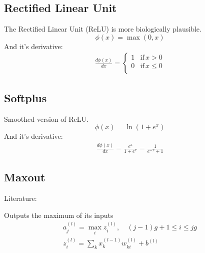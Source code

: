 \subsection{Rectified Linear Unit}
The Rectified Linear Unit (ReLU) is more biologically plausible.
\begin{equation}
\phi(x) = \max(0, x)
\end{equation}
And it's derivative:
\begin{align*}
\frac{d\phi(x)}{dx} = 
	\begin{cases}
		1 & \text{if}\, x > 0\\
		0 & \text{if}\, x \leq 0\\
	\end{cases}
\end{align*}

\subsection{Softplus}
Smoothed version of ReLU.
\begin{equation}\label{eq:softplus}
\phi(x) = \ln(1 + e^x)
\end{equation}
And it's derivative:
\begin{align*}
\frac{d\phi(x)}{dx} = \frac{e^x}{1 + e^x} = \frac{1}{e^{-x} + 1}
\end{align*}

\subsection{Maxout}
Literature: \cite{Goodfellow2013}

Outputs the maximum of its inputs
\begin{align}
a_j^{(l)} = \max_i z_i^{(l)}, \quad (j-1)g +1 \leq i \leq j g \\
z_i^{(l)} = \sum_k x_k^{(l-1)} w_{ki}^{(l)} + b^{(l)}
\end{align}